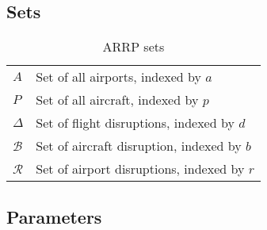 \subsection{Sets}

\begin{table}[h!]
	\centering
	\caption{ARRP sets}
	\label{tbl:sets}
		
	\begin{tabular}{ll}
		\hline
		$A$   & Set of all airports, indexed by $a$   \\ 
		$P$   & Set of all aircraft, indexed by $p$   \\ 

		$\Delta$   & Set of flight disruptions, indexed by $d$ \\
		$\mathcal{B}$   & Set of aircraft disruption, indexed by $b$ \\
		$\mathcal{R}$	& Set of airport disruptions, indexed by $r$ \\
		\hline	
	\end{tabular}
\end{table}


\subsection{Parameters}



